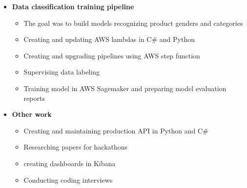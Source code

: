 \documentclass[10pt,a4paper,ragged2e,withhyper, normalphoto]{altacv}
\begin{document}
\begin{paracol}{2}


    \begin{itemize}
        \item \textbf{\textcolor{DarkPastelRed}{Data classification training pipeline}}
        \begin{itemize}
            \item The goal was to build models recognizing product genders and categories
            \item Creating and updating AWS lambdas in C\# and Python
            \item Creating and upgrading pipelines using AWS step function
            \item Supervising data labeling
            \item Training model in AWS Sagemaker and preparing model evaluation reports
        \end{itemize}

        \item  \textbf{\textcolor{DarkPastelRed}{Other work}}
            \begin{itemize}
                \item Creating and maintaining production API in Python and C\#
                \item Researching papers for hackathons
                \item creating dashboards in Kibana
                \item Conducting coding interviews
            \end{itemize}
    \end{itemize}
    \divider
    

\end{paracol}
\end{document}
